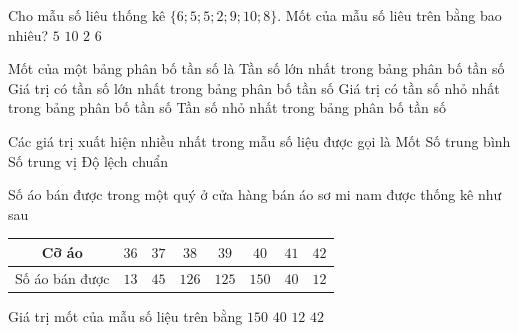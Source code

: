 

\begin{ex}%
	Cho mẫu số liêu thống kê $\{6; 5; 5; 2; 9; 10; 8\}$. Mốt của mẫu số liêu trên bằng  bao nhiêu?
	 \choice
		{\True  $5$}
		 {$10$}
		 {$2$}
		{$6$} 
\end{ex}

\begin{ex}%
	Mốt của một bảng phân  bố tần số là
	 \choice
		{Tần số lớn nhất trong bảng phân  bố tần số}
		 {\True Giá trị có tần số lớn nhất trong bảng phân bố tần số}
		{Giá  trị có tần số nhỏ nhất trong bảng phân bố tần số}
		{Tần số nhỏ nhất trong bảng  phân bố tần số}
\end{ex}

\begin{ex}%
	Các giá trị xuất hiện nhiều nhất  trong mẫu số liệu được gọi là
	\choice 
		{\True  Mốt}
		{Số trung  bình}
		 {Số trung vị}
		{Độ lệch chuẩn} 
\end{ex}

\begin{ex}%
	Số  áo bán được trong một quý ở cửa hàng bán áo sơ mi nam được thống kê như sau
	\begin{longtable}{|c|c|c|c|c|c|c|c|}
		\hline Cỡ áo & $36$ & $37$ & $38$ & $39$ & $40$ & $41$ & $42$  \\
		\hline Số áo bán được & $13$ & $45$ & $126$ & $125$ &  $150$ & $40$ & $12$\\
		 \hline
	\end{longtable}
	Giá  trị mốt của mẫu số liệu trên bằng
	\choice 
		 {$ 150 $}
		{\True  $ 40 $}
		 {$ 12 $}
		{$ 42  $}
\end{ex}

